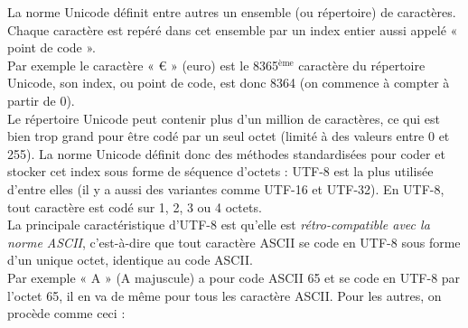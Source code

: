 La norme Unicode définit entre autres un ensemble (ou répertoire) de caractères. Chaque caractère est repéré dans cet ensemble par un index
entier aussi appelé « point de code ».\\
Par exemple le caractère « € » (euro) est le 8365$^{\text{ème}}$ caractère du répertoire Unicode, son index, ou point de code, est donc
8364
(on commence à compter à partir de 0).\\
Le répertoire Unicode peut contenir plus d'un million de caractères, ce qui est bien trop grand pour être codé par un seul octet (limité à des
valeurs entre 0 et 255).
La norme Unicode définit donc des méthodes standardisées pour coder et stocker cet index sous forme de séquence d'octets :
UTF-8 est la plus utilisée d'entre elles (il y a aussi des variantes comme UTF-16 et UTF-32).
En UTF-8, tout caractère est codé sur 1, 2, 3 ou 4 octets.\\
La principale caractéristique d'UTF-8 est qu'elle est \textit{rétro-compatible avec la norme ASCII}, c'est-à-dire que tout caractère ASCII se
code
en UTF-8 sous forme d'un unique octet, identique au code ASCII.\\
Par exemple « A » (A majuscule) a pour code ASCII 65 et se code en UTF-8 par l'octet 65, il en va de même pour tous les caractère ASCII.
Pour les autres, on procède comme ceci :
